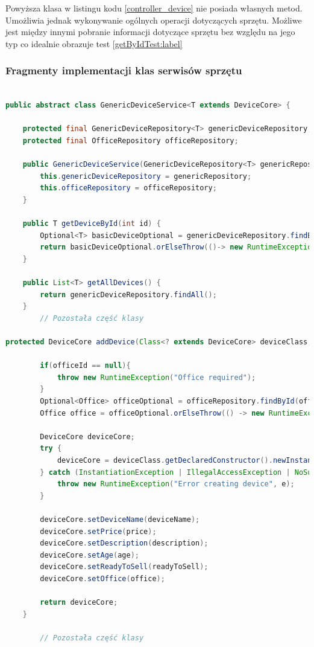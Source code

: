 Powyższa klasa w listingu kodu \ref{controller_device} nie posiada własnych metod. Umożliwia jednak wykonywanie ogólnych operacji dotyczących sprzętu. Możliwe jest między innymi pobranie informacji dotyczące sprzętu bez względu na jego typ co idealnie obrazuje test \ref{getByIdTest:label}


\subsubsection{Fragmenty implementacji klas serwisów sprzętu}


\begin{lstlisting}[language=Java, style=JavaStyle,  caption={Klasa nadrzędna serwisu sprzętu GenericDeviceService}, label={service_tablet}]

public abstract class GenericDeviceService<T extends DeviceCore> {

    protected final GenericDeviceRepository<T> genericDeviceRepository;
    protected final OfficeRepository officeRepository;

    public GenericDeviceService(GenericDeviceRepository<T> genericRepository, OfficeRepository officeRepository) {
        this.genericDeviceRepository = genericRepository;
        this.officeRepository = officeRepository;
    }

    public T getDeviceById(int id) {
        Optional<T> basicDeviceOptional = genericDeviceRepository.findById(id);
        return basicDeviceOptional.orElseThrow(()-> new RuntimeException("Device not found with id: " + id));
    }

    public List<T> getAllDevices() {
        return genericDeviceRepository.findAll();
    }
		// Pozostała część klasy

protected DeviceCore addDevice(Class<? extends DeviceCore> deviceClass, String deviceName, Double price, String description, Integer age, Boolean readyToSell, Integer officeId) {

        if(officeId == null){
            throw new RuntimeException("Office required");
        }
        Optional<Office> officeOptional = officeRepository.findById(officeId);
        Office office = officeOptional.orElseThrow(() -> new RuntimeException("Office not found with id: " + officeId));

        DeviceCore deviceCore;
        try {
            deviceCore = deviceClass.getDeclaredConstructor().newInstance();
        } catch (InstantiationException | IllegalAccessException | NoSuchMethodException | InvocationTargetException e) {
            throw new RuntimeException("Error creating device", e);
        }

        deviceCore.setDeviceName(deviceName);
        deviceCore.setPrice(price);
        deviceCore.setDescription(description);
        deviceCore.setAge(age);
        deviceCore.setReadyToSell(readyToSell);
        deviceCore.setOffice(office);

        return deviceCore;
    }
		
		// Pozostała część klasy

\end{lstlisting}
